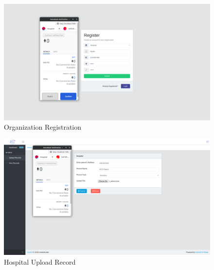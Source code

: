 \begin{figure}[!b]
	\centering
	\includegraphics[width=\linewidth]{Images/Organisation/OrganizationRegister.png}
	\caption{ Organization Registration}
\end{figure}
\begin{figure}[!b]
	\centering
	\includegraphics[width=\linewidth]{Images/Organisation/HospitalUploadRecord.png}
	\caption{ Hospital Upload Record}
\end{figure}


